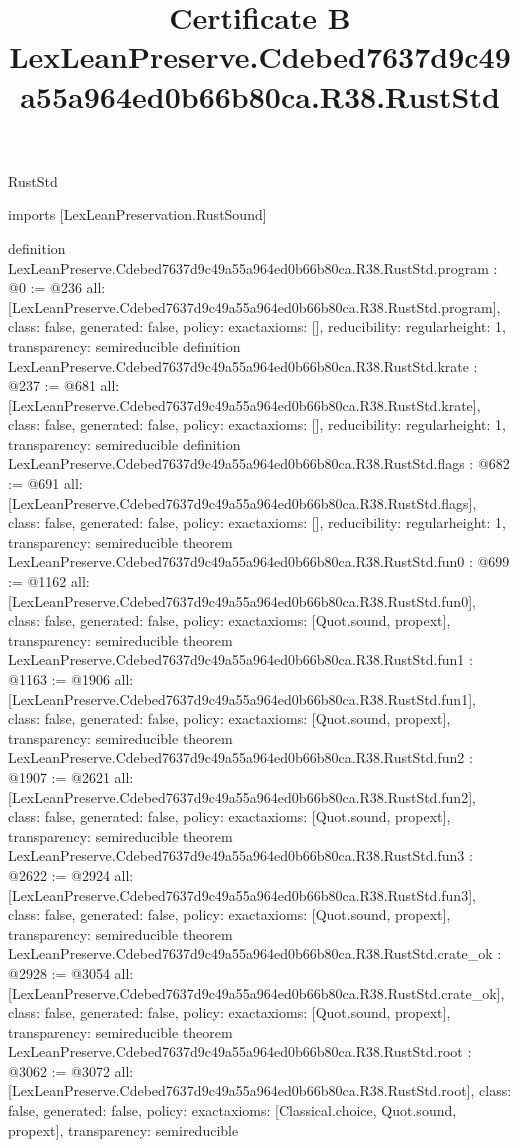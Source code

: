 \begin{lexlean}{RustStd}
\title{Certificate B LexLeanPreserve.Cdebed7637d9c49a55a964ed0b66b80ca.R38.RustStd}
\begin{coremodule}
imports [LexLeanPreservation.RustSound]

definition LexLeanPreserve.Cdebed7637d9c49a55a964ed0b66b80ca.R38.RustStd.program : @0 := @236 {
  all: [LexLeanPreserve.Cdebed7637d9c49a55a964ed0b66b80ca.R38.RustStd.program],
  class: false,
  generated: false,
  policy: exact{axioms: []},
  reducibility: regular{height: 1},
  transparency: semireducible
}
definition LexLeanPreserve.Cdebed7637d9c49a55a964ed0b66b80ca.R38.RustStd.krate : @237 := @681 {
  all: [LexLeanPreserve.Cdebed7637d9c49a55a964ed0b66b80ca.R38.RustStd.krate],
  class: false,
  generated: false,
  policy: exact{axioms: []},
  reducibility: regular{height: 1},
  transparency: semireducible
}
definition LexLeanPreserve.Cdebed7637d9c49a55a964ed0b66b80ca.R38.RustStd.flags : @682 := @691 {
  all: [LexLeanPreserve.Cdebed7637d9c49a55a964ed0b66b80ca.R38.RustStd.flags],
  class: false,
  generated: false,
  policy: exact{axioms: []},
  reducibility: regular{height: 1},
  transparency: semireducible
}
theorem LexLeanPreserve.Cdebed7637d9c49a55a964ed0b66b80ca.R38.RustStd.fun0 : @699 := @1162 {
  all: [LexLeanPreserve.Cdebed7637d9c49a55a964ed0b66b80ca.R38.RustStd.fun0],
  class: false,
  generated: false,
  policy: exact{axioms: [Quot.sound, propext]},
  transparency: semireducible
}
theorem LexLeanPreserve.Cdebed7637d9c49a55a964ed0b66b80ca.R38.RustStd.fun1 : @1163 := @1906 {
  all: [LexLeanPreserve.Cdebed7637d9c49a55a964ed0b66b80ca.R38.RustStd.fun1],
  class: false,
  generated: false,
  policy: exact{axioms: [Quot.sound, propext]},
  transparency: semireducible
}
theorem LexLeanPreserve.Cdebed7637d9c49a55a964ed0b66b80ca.R38.RustStd.fun2 : @1907 := @2621 {
  all: [LexLeanPreserve.Cdebed7637d9c49a55a964ed0b66b80ca.R38.RustStd.fun2],
  class: false,
  generated: false,
  policy: exact{axioms: [Quot.sound, propext]},
  transparency: semireducible
}
theorem LexLeanPreserve.Cdebed7637d9c49a55a964ed0b66b80ca.R38.RustStd.fun3 : @2622 := @2924 {
  all: [LexLeanPreserve.Cdebed7637d9c49a55a964ed0b66b80ca.R38.RustStd.fun3],
  class: false,
  generated: false,
  policy: exact{axioms: [Quot.sound, propext]},
  transparency: semireducible
}
theorem LexLeanPreserve.Cdebed7637d9c49a55a964ed0b66b80ca.R38.RustStd.crate_ok : @2928 := @3054 {
  all: [LexLeanPreserve.Cdebed7637d9c49a55a964ed0b66b80ca.R38.RustStd.crate_ok],
  class: false,
  generated: false,
  policy: exact{axioms: [Quot.sound, propext]},
  transparency: semireducible
}
theorem LexLeanPreserve.Cdebed7637d9c49a55a964ed0b66b80ca.R38.RustStd.root : @3062 := @3072 {
  all: [LexLeanPreserve.Cdebed7637d9c49a55a964ed0b66b80ca.R38.RustStd.root],
  class: false,
  generated: false,
  policy: exact{axioms: [Classical.choice, Quot.sound, propext]},
  transparency: semireducible
}


\end{coremodule}
\end{lexlean}
